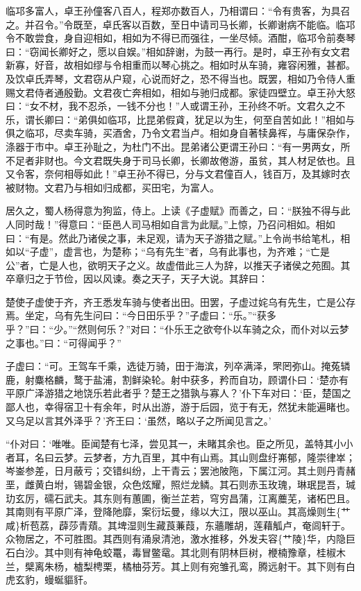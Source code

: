 \documentclass[]{article}
\begin{document}
临邛多富人，卓王孙僮客八百人，程郑亦数百人，乃相谓曰：``令有贵客，为具召之。并召令。''令既至，卓氏客以百数，至日中请司马长卿，长卿谢病不能临。临邛令不敢尝食，身自迎相如，相如为不得已而强往，一坐尽倾。酒酣，临邛令前奏琴曰：``窃闻长卿好之，愿以自娱。''相如辞谢，为鼓一再行。是时，卓王孙有女文君新寡，好音，故相如缪与令相重而以琴心挑之。相如时从车骑，雍容闲雅，甚都。及饮卓氏弄琴，文君窃从户窥，心说而好之，恐不得当也。既罢，相如乃令侍人重赐文君侍者通殷勤。文君夜亡奔相如，相如与驰归成都。家徒四壁立。卓王孙大怒曰：``女不材，我不忍杀，一钱不分也！''人或谓王孙，王孙终不听。文君久之不乐，谓长卿曰：``弟俱如临邛，比昆弟假貣，犹足以为生，何至自苦如此！''相如与俱之临邛，尽卖车骑，买酒舍，乃令文君当卢。相如身自著犊鼻裈，与庸保杂作，涤器于市中。卓王孙耻之，为杜门不出。昆弟诸公更谓王孙曰：``有一男两女，所不足者非财也。今文君既失身于司马长卿，长卿故倦游，虽贫，其人材足依也。且又令客，奈何相辱如此！''卓王孙不得已，分与文君僮百人，钱百万，及其嫁时衣被财物。文君乃与相如归成都，买田宅，为富人。

居久之，蜀人杨得意为狗监，侍上。上读《子虚赋》而善之，曰：``朕独不得与此人同时哉！''得意曰：``臣邑人司马相如自言为此赋。''上惊，乃召问相如。相如曰：``有是。然此乃诸侯之事，未足观，请为天子游猎之赋。''上令尚书给笔札，相如以``子虚''，虚言也，为楚称；``乌有先生''者，乌有此事也，为齐难；``亡是公''者，亡是人也，欲明天子之义。故虚借此三人为辞，以推天子诸侯之苑囿。其卒章归之于节俭，因以风谏。奏之天子，天子大说。其辞曰：

楚使子虚使于齐，齐王悉发车骑与使者出田。田罢，子虚过姹乌有先生，亡是公存焉。坐定，乌有先生问曰：``今日田乐乎？''子虚曰：``乐。''``获多乎？''曰：``少。''``然则何乐？''对曰：``仆乐王之欲夸仆以车骑之众，而仆对以云梦之事也。''曰：``可得闻乎？''

子虚曰：``可。王驾车千乘，选徒万骑，田于海滨，列卒满泽，罘罔弥山。掩菟辚鹿，射麋格麟，鹜于盐浦，割鲜染轮。射中获多，矜而自功，顾谓仆曰：`楚亦有平原广泽游猎之地饶乐若此者乎？楚王之猎孰与寡人？'仆下车对曰：`臣，楚国之鄙人也，幸得宿卫十有余年，时从出游，游于后园，览于有无，然犹未能遍睹也。又乌足以言其外泽乎？'齐王曰：`虽然，略以子之所闻见言之。'

``仆对曰：`唯唯。臣闻楚有七泽，尝见其一，未睹其余也。臣之所见，盖特其小小者耳，名曰云梦。云梦者，方九百里，其中有山焉。其山则盘纡岪郁，隆崇律崒；岑崟参差，日月蔽亏；交错纠纷，上干青云；罢池陂陁，下属江河。其土则丹青赭垩，雌黄白坿，锡碧金银，众色炫耀，照烂龙鳞。其石则赤玉玫瑰，琳珉昆吾，瑊玏玄厉，礝石武夫。其东则有蕙圃，衡兰芷若，穹穷昌蒲，江离蘪芜，诸柘巴且。其南则有平原广泽，登降阤靡，案衍坛曼，缘以大江，限以巫山。其高燥则生\{艹咸\}析苞荔，薜莎青薠。其埤湿则生藏莨蒹葭，东蘠雕胡，莲藉觚卢，奄闾轩于。众物居之，不可胜图。其西则有涌泉清池，激水推移，外发夫容\{艹陵\}华，内隐巨石白沙。其中则有神龟蛟鼍，毒冒鳖鼋。其北则有阴林巨树，楩楠豫章，桂椒木兰，檗离朱杨，樝梨梬栗，橘柚芬芳。其上则有宛雏孔鸾，腾远射干。其下则有白虎玄豹，蟃蜒貙豻。
\end{document}
